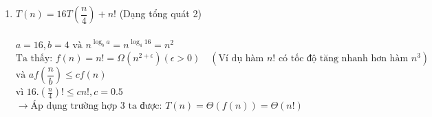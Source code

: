 \documentclass[12pt, letterpaper]{article}
\begin{document}
\begin{enumerate}[label=\bfseries\large\theenumi.]
    \item $ T(n) = 16T\left( \dfrac{n}{4} \right) + n! $ (Dạng tổng quát 2)\\ \\
        $ a = 16, b = 4 \text{ và } n^{\log_b a} = n^{\log_4 16} = n^2 $ \\
        $ \text{Ta thấy: } f(n) = n! = \Omega(n^{2 + \epsilon}) (\epsilon > 0) \quad (\text{Ví dụ hàm $n!$ có tốc độ tăng nhanh hơn hàm $n^3$})$ \\
        $ \text{và } af\left(\dfrac{n}{b}\right) \leq cf(n) $ \\
        $ \text{vì } 16.(\frac{n}{4})! \leq cn!, c = 0.5 $ \\
        $ \rightarrow \text{Áp dụng trường hợp 3 ta được: } T(n) = \Theta(f(n)) = \Theta(n! ) $
\end{enumerate}
\end{document}
